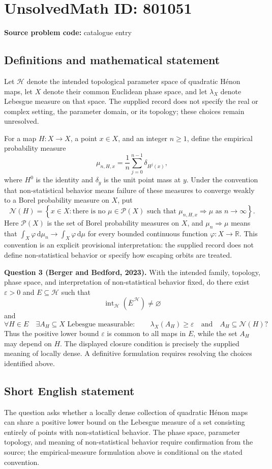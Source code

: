 \documentclass[11pt]{article}
\newcommand{\R}{\mathbb{R}}
\begin{document}
\section*{UnsolvedMath ID: 801051}
\textbf{Source problem code:} catalogue entry
\subsection{Definitions and mathematical statement}
Let \(\mathcal H\) denote the intended topological parameter space of quadratic H\'enon maps, let \(X\) denote their common Euclidean phase space, and let \(\lambda_X\) denote Lebesgue measure on that space. The supplied record does not specify the real or complex setting, the parameter domain, or its topology; these choices remain unresolved.

For a map \(H\colon X\to X\), a point \(x\in X\), and an integer \(n\geq 1\), define the empirical probability measure
\[
\mu_{n,H,x}=\frac1n\sum_{j=0}^{n-1}\delta_{H^j(x)},
\]
where \(H^0\) is the identity and \(\delta_y\) is the unit point mass at \(y\). Under the convention that non-statistical behavior means failure of these measures to converge weakly to a Borel probability measure on \(X\), put
\[
\mathcal N(H)=\left\{x\in X:\text{there is no }\mu\in\mathcal P(X)\text{ such that }\mu_{n,H,x}\Rightarrow\mu\text{ as }n\to\infty\right\}.
\]
Here \(\mathcal P(X)\) is the set of Borel probability measures on \(X\), and \(\mu_n\Rightarrow\mu\) means that \(\int_X\varphi\,\mathrm d\mu_n\to\int_X\varphi\,\mathrm d\mu\) for every bounded continuous function \(\varphi\colon X\to\R\). This convention is an explicit provisional interpretation: the supplied record does not define non-statistical behavior or specify how escaping orbits are treated.

\textbf{Question 3 (Berger and Bedford, 2023).} With the intended family, topology, phase space, and interpretation of non-statistical behavior fixed, do there exist \(\varepsilon>0\) and \(E\subseteq\mathcal H\) such that
\[
\operatorname{int}_{\mathcal H}\!\left(\overline E^{\,\mathcal H}\right)\neq\varnothing
\]
and
\[
\forall H\in E\quad\exists A_H\subseteq X\text{ Lebesgue measurable}:\qquad
\lambda_X(A_H)\geq\varepsilon
\quad\text{and}\quad
A_H\subseteq\mathcal N(H)?
\]
Thus the positive lower bound \(\varepsilon\) is common to all maps in \(E\), while the set \(A_H\) may depend on \(H\). The displayed closure condition is precisely the supplied meaning of locally dense. A definitive formulation requires resolving the choices identified above.
\subsection{Short English statement}
The question asks whether a locally dense collection of quadratic H\'enon maps can share a positive lower bound on the Lebesgue measure of a set consisting entirely of points with non-statistical behavior. The phase space, parameter topology, and meaning of non-statistical behavior require confirmation from the source; the empirical-measure formulation above is conditional on the stated convention.
\end{document}
